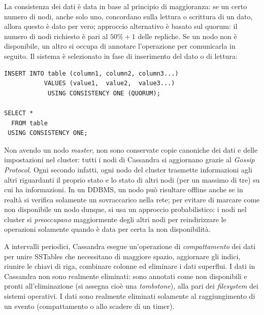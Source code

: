 \documentclass[a4page, 11pt]{article}
\begin{document}
La consistenza dei dati è data in base al principio di maggioranza: se un certo numero di nodi, anche solo uno, concordano sulla lettura o scrittura di un dato, allora questo è dato per vero; approccio alternativo è basato sul quorum: il numero di nodi richiesto è pari al $50\% + 1$ delle repliche.
Se un nodo non è disponibile, un altro si occupa di annotare l'operazione per comunicarla in seguito.
Il sistema è selezionato in fase di inserimento del dato o di lettura:
\begin{verbatim}
INSERT INTO table (column1, column2, column3...)
           VALUES (value1,  value2,  value3...)
            USING CONSISTENCY ONE (QUORUM);

SELECT *
  FROM table
 USING CONSISTENCY ONE;
\end{verbatim}

Non avendo un nodo \textit{master}, non sono conservate copie canoniche dei dati e delle impostazioni nel cluster: tutti i nodi di Cassandra si aggiornano grazie al \textit{Gossip Protocol}.
Ogni secondo infatti, ogni nodo del cluster trasmette informazioni agli altri riguardanti il proprio stato e lo stato di altri nodi (per un massimo di tre) su cui ha informazioni.
In un DDBMS, un nodo può risultare offline anche se in realtà si verifica solamente un sovraccarico nella rete; per evitare di marcare come non disponibile un nodo dunque, si usa un approccio probabilistico: i nodi nel cluster si \textit{preoccupano} maggiormente degli altri nodi per reindirizzare le operazioni solamente quando è data per certa la non disponibilità.

A intervalli periodici, Cassandra esegue un'operazione di \textit{compattamento} dei dati per unire SSTables che necessitano di maggiore spazio, aggiornare gli indici, riunire le chiavi di riga, combinare colonne ed eliminare i dati superflui.
I dati in Cassandra non sono realmente eliminati: sono annotati come non disponibili e pronti all'eliminazione (si assegna cioè una \textit{tombstone}), alla pari dei \textit{filesystem} dei sistemi operativi.
I dati sono realmente eliminati solamente al raggiungimento di un evento (compattamento o allo scadere di un timer).
\end{document}
